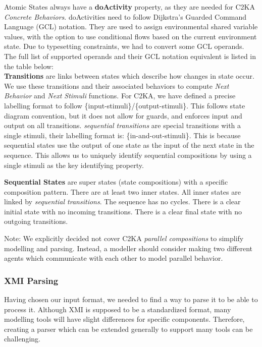 \documentclass[11pt]{article}
\begin{document}
    Atomic States always have a \textbf{doActivity} property,
    as they are needed for C2KA \textit{Concrete Behaviors}.
    doActivities need to follow Dijkstra's Guarded Command Language (GCL) notation.
    They are used to assign environmental shared variable values,
    with the option to use conditional flows based on the current environment state.
    Due to typesetting constraints, we had to convert some GCL operands.
    The full list of supported operands and their GCL notation equivalent is listed in the table below:
    \\

    \textbf{Transitions} are links between states which describe how changes in state occur.
    We use these transitions and their associated behaviors to compute \textit{Next Behavior} and \textit{Next Stimuli} functions.
    For C2KA, we have defined a precise labelling format to follow \{input-stimuli\}/\{output-stimuli\}.
    This follows state diagram convention, but it does not allow for guards,
    and enforces input and output on all transitions.
    \textit{sequential transitions} are special transitions with a single stimuli, their labelling format is: \{in-and-out-stimuli\}.
    This is because sequential states use the output of one state as the input of the next state in the sequence.
    This allows us to uniquely identify sequential compositions by using a single stimuli as the key identifying property.

    \textbf{Sequential States} are super states (state compositions) with a specific composition pattern.
    There are at least two inner states.
    All inner states are linked by \textit{sequential transitions}.
    The sequence has no cycles.
    There is a clear initial state with no incoming transitions.
    There is a clear final state with no outgoing transitions.

    Note: We explicitly decided not cover C2KA \textit{parallel compositions} to simplify modelling and parsing.
    Instead, a modeller should consider making two different agents which communicate
    with each other to model parallel behavior.

    \subsubsection{XMI Parsing}\label{subsubsec:parsing}
    Having chosen our input format, we needed to find a way to parse it to be able to process it.
    Although XMI is supposed to be a standardized format,
    many modelling tools will have slight differences for specific components.
    Therefore, creating a parser which can be extended generally to support many tools can be challenging.
\end{document}
